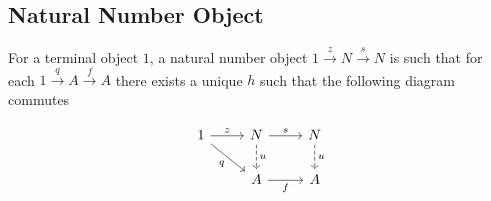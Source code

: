 \subsection{Natural Number Object}
For a terminal object $1$, a natural number object
$1\overset{z}{\to}N\overset{s}{\to}N$ is such that for each
$1\overset{q}{\to}A\overset{f}{\to}A$ there exists a unique $h$ such that the
following diagram commutes \parencite{awodey:category_theory}

\[\begin{tikzcd}
	1 & N & N \\
	& A & A
	\arrow["z", from=1-1, to=1-2]
	\arrow["q"', from=1-1, to=2-2]
	\arrow["s", from=1-2, to=1-3]
	\arrow["f"', from=2-2, to=2-3]
	\arrow["u", dashed, from=1-2, to=2-2]
	\arrow["u", dashed, from=1-3, to=2-3]
\end{tikzcd}\]